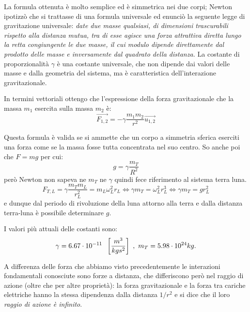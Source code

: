 \documentclass[class=book, crop=false, oneside, 12pt]{standalone}
\begin{document}
La formula ottenuta è molto semplice ed è simmetrica nei due corpi; 
Newton ipotizzò che si trattasse di una formula universale ed enunciò la seguente legge di gravitazione universale: \newline
\emph{date due masse qualsiasi, di dimensioni trascurabili rispetto alla distanza mutua, tra di esse agisce una forza attrattiva diretta lungo la retta congiungente le due masse, il cui modulo dipende direttamente dal prodotto delle masse e inversamente dal quadrato della distanza.}\newline
La costante di proporzionalità \(\gamma\) è una costante universale, che non dipende dai valori delle masse e dalla geometria del sistema, ma è caratteristica dell'interazione gravitazionale.

In termini vettoriali ottengo che l'espressione della forza gravitazionale che la massa \(m_1\) esercita sulla massa \(m_2\) è:
\begin{equation}
    \overrightarrow{F_{1,2}} = - \gamma \frac{m_1 m_2}{r^2} \overrightarrow{u_{1,2}}
\end{equation}

Questa formula è valida se si ammette che un corpo a simmetria sferica eserciti una forza come se la massa fosse tutta concentrata nel suo centro.
So anche poi che \(F = mg\) per cui:
\begin{equation}
    g = \gamma \frac{m_T}{R^2}
\end{equation}
però Newton non sapeva ne \(m_T\) ne \(\gamma\) quindi fece riferimento al sistema terra luna.
\begin{equation}
    F_{T,L} = \gamma \frac{m_T m_L}{r_L^2} = m_L \omega_L^2 r_L \Leftrightarrow \gamma m_T = \omega_L^2 r_L^3 \Leftrightarrow \gamma m_T = g r_L^2
\end{equation}
e dunque dal periodo di rivoluzione della luna attorno alla terra e dalla distanza terra-luna è possibile determinare \(g\).

I valori più attuali delle costanti sono:
\begin{equation*}
    \gamma = 6.67 \cdot 10^{-11} \hspace{0.2cm} \left[\frac{m^3}{kg s^2}\right] \ , \ m_T = 5.98 \cdot 10^{24} kg .
\end{equation*}

A differenza delle forza che abbiamo visto precedentemente le interazioni fondamentali conosciute sono forze a distanza, che differiscono però nel raggio di azione (oltre che per altre proprietà): 
la forza gravitazionale e la forza tra cariche elettriche hanno la stessa dipendenza dalla distanza \(1 / r^2\) e si dice che il loro \emph{raggio di azione è infinito}.
\end{document}
